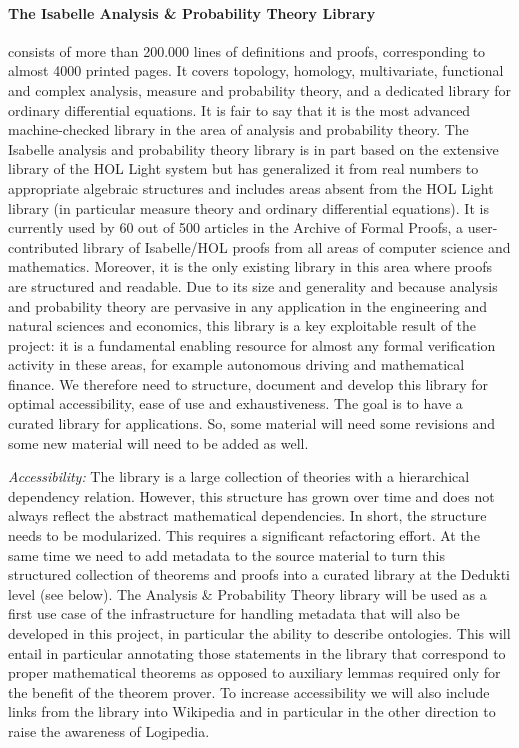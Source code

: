 \paragraph*{The Isabelle Analysis \& Probability Theory Library}
consists of more
than 200.000 lines of definitions and proofs, corresponding to almost
4000 printed pages. It covers topology, homology, multivariate,
functional and complex analysis, measure and probability theory, and a
dedicated library for ordinary differential equations. It is fair to
say that it is the most advanced machine-checked library in the area
of analysis and probability theory. The Isabelle analysis and
probability theory library is in part based on the extensive library
of the HOL Light system but has generalized it from real numbers to
appropriate algebraic structures and includes areas absent from the
HOL Light library (in particular measure theory and ordinary
differential equations). It is currently used by 60 out of 500
articles in the Archive of Formal Proofs, a user-contributed library
of Isabelle/HOL proofs from all areas of computer science and
mathematics. Moreover, it is the only existing library in this area
where proofs are structured and readable. Due to its size and
generality and because analysis and probability theory are pervasive
in any application in the engineering and natural sciences and
economics, this library is a key exploitable result of the project: it
is a fundamental enabling resource for almost any formal verification
activity in these areas, for example autonomous driving and
mathematical finance. We therefore need to structure,
document and develop this library for optimal accessibility, ease of
use and exhaustiveness. The goal is to have a curated library for
applications. So, some material will need some revisions
and some new material will need to be added as well.

\emph{Accessibility:}
The library is a large collection of theories with a hierarchical dependency
relation. However, this structure has grown over time and does not always
reflect the abstract mathematical dependencies. In short, the structure needs
to be modularized. This requires a significant refactoring effort.
%
At the same time we need to add metadata to the source material to
turn this structured collection of theorems and proofs into a curated
library at the Dedukti level (see below). The Analysis \& Probability
Theory library will be used as a first use case of the infrastructure
for handling metadata that will also be developed in this project, in
particular the ability to describe ontologies.  This will entail in
particular annotating those statements in the library that correspond
to proper mathematical theorems as opposed to auxiliary lemmas
required only for the benefit of the theorem prover.  To increase
accessibility we will also include links from the library into
Wikipedia and in particular in the other direction to raise the
awareness of Logipedia.

